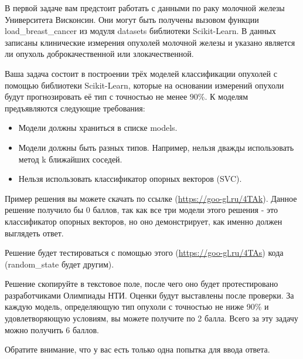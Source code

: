 
В первой задаче вам предстоит работать с данными по раку молочной железы Университета Висконсин. 
Они могут быть получены вызовом функции \linebreak load\_breast\_cancer из модуля datasets библиотеки Scikit-Learn. 
В данных записаны клинические измерения опухолей молочной железы и указано является ли опухоль 
доброкачественной или злокачественной.

Ваша задача состоит в построении трёх моделей классификации опухолей с помощью библиотеки Scikit-Learn, 
которые на основании измерений опухоли будут прогнозировать её тип с точностью не менее $90\%$. 
К моделям предъявляются следующие требования:

\begin{itemize}
    \item Модели должны храниться в списке models.
    \item Модели должны быть разных типов. Например, нельзя дважды использовать метод k ближайших соседей.
    \item Нельзя использовать классификатор опорных векторов (SVC).
\end{itemize}

Пример решения вы можете скачать по ссылке (\url{https://goo-gl.ru/4TAk}).  Данное решение получило бы 0 баллов, так как все три модели этого решения - это классификатор опорных векторов, но оно демонстрирует, как именно должен выглядеть ответ.

Решение будет тестироваться с помощью этого (\url{https://goo-gl.ru/4TAs}) кода (random\_state будет другим).

Решение скопируйте в текстовое поле, после чего оно будет протестировано разработчиками Олимпиады НТИ. Оценки будут выставлены после проверки. За каждую модель, определяющую тип опухоли с точностью не ниже 90\% и удовлетворяющую условиям, вы можете получите по 2 балла. Всего за эту задачу можно получить 6 баллов. 

Обратите внимание, что у вас есть только одна попытка для ввода ответа.

